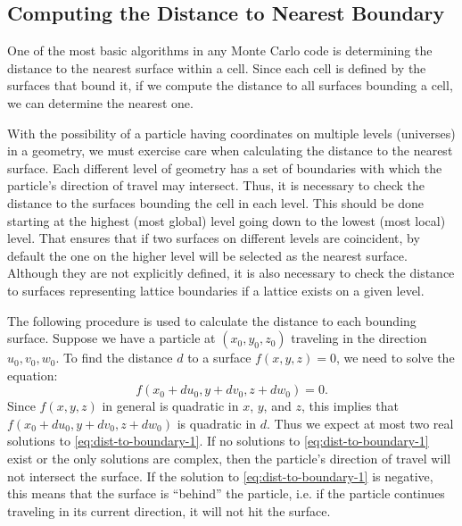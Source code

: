 \subsection{Computing the Distance to Nearest Boundary}

One of the most basic algorithms in any Monte Carlo code is determining the
distance to the nearest surface within a cell. Since each cell is defined by
the surfaces that bound it, if we compute the distance to all surfaces bounding
a cell, we can determine the nearest one.

With the possibility of a particle having coordinates on multiple levels
(universes) in a geometry, we must exercise care when calculating the distance
to the nearest surface. Each different level of geometry has a set of boundaries
with which the particle's direction of travel may intersect. Thus, it is
necessary to check the distance to the surfaces bounding the cell in each
level. This should be done starting at the highest (most global) level going
down to the lowest (most local) level. That ensures that if two surfaces on
different levels are coincident, by default the one on the higher level will be
selected as the nearest surface. Although they are not explicitly defined, it is
also necessary to check the distance to surfaces representing lattice boundaries
if a lattice exists on a given level.

The following procedure is used to calculate the distance to each bounding
surface. Suppose we have a particle at $(x_0,y_0,z_0)$ traveling in the
direction $u_0,v_0,w_0$. To find the distance $d$ to a surface $f(x,y,z) = 0$,
we need to solve the equation:
\begin{equation}
  \label{eq:dist-to-boundary-1}
  f(x_0 + du_0, y + dv_0, z + dw_0) = 0.
\end{equation}
Since $f(x,y,z)$ in general is quadratic in $x$, $y$, and $z$, this implies that
$f(x_0 + du_0, y + dv_0, z + dw_0)$ is quadratic in $d$. Thus we expect at most
two real solutions to \eqref{eq:dist-to-boundary-1}. If no solutions to
\eqref{eq:dist-to-boundary-1} exist or the only solutions are complex, then the
particle's direction of travel will not intersect the surface. If the solution
to \eqref{eq:dist-to-boundary-1} is negative, this means that the surface is
``behind'' the particle, i.e. if the particle continues traveling in its current
direction, it will not hit the surface.


